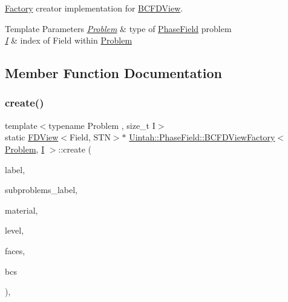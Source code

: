 \hyperlink{classUintah_1_1PhaseField_1_1Factory}{Factory} creator implementation for \hyperlink{classUintah_1_1PhaseField_1_1BCFDView}{B\+C\+F\+D\+View}. 


\begin{DoxyTemplParams}{Template Parameters}
{\em \hyperlink{classUintah_1_1PhaseField_1_1Problem}{Problem}} & type of \hyperlink{namespaceUintah_1_1PhaseField}{Phase\+Field} problem \\
\hline
{\em \hyperlink{structUintah_1_1PhaseField_1_1I}{I}} & index of Field within \hyperlink{classUintah_1_1PhaseField_1_1Problem}{Problem} \\
\hline
\end{DoxyTemplParams}


\subsection{Member Function Documentation}
\mbox{\label{classUintah_1_1PhaseField_1_1BCFDViewFactory_ae064d3d5c16b89c2afe44205cedc4ff8}} 
\subsubsection{\texorpdfstring{create()}{create()}}
{\footnotesize\ttfamily template$<$typename Problem , size\+\_\+t I$>$ \\
static \hyperlink{namespaceUintah_1_1PhaseField_a63032464b1cd54eaa53c1c29109746ac}{F\+D\+View}$<$Field, S\+TN$>$$\ast$ \hyperlink{classUintah_1_1PhaseField_1_1BCFDViewFactory}{Uintah\+::\+Phase\+Field\+::\+B\+C\+F\+D\+View\+Factory}$<$ \hyperlink{classUintah_1_1PhaseField_1_1Problem}{Problem}, \hyperlink{structUintah_1_1PhaseField_1_1I}{I} $>$\+::create (\begin{DoxyParamCaption}\item[{const typename Field\+::label\+\_\+type \&}]{label,  }\item[{const Var\+Label $\ast$}]{subproblems\+\_\+label,  }\item[{int}]{material,  }\item[{const Level $\ast$}]{level,  }\item[{const std\+::list$<$ Patch\+::\+Face\+Type $>$ \&}]{faces,  }\item[{const std\+::vector$<$ \hyperlink{structUintah_1_1PhaseField_1_1BCInfo}{B\+C\+Info}$<$ Field $>$ $>$ \&}]{bcs }\end{DoxyParamCaption})\hspace{0.3cm}{\ttfamily [inline]}, {\ttfamily [static]}}




